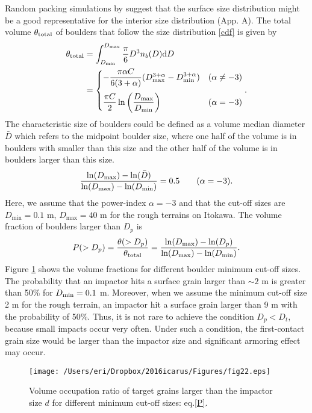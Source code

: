 \documentclass[3p,authoryear]{elsarticle}
\renewcommand{\d}{{\rm{d}}}
\begin{document}
Random packing simulations by \citet{tancredi2015} suggest that the surface size distribution might be a good representative for the interior size distribution (App. A).
The total volume $\theta_{\rm total}$ of boulders that follow the size distribution \eqref{cdf} is given by
\begin{align}
	\theta_\text{total}&=\int_{D_{\rm min}}^{D_{\rm max}} \frac{\pi}{6} D^3 n_b(D) {\rm d} D \notag \\
	&=\begin{cases} -\dfrac{\pi \alpha C}{6(3+\alpha)} (D_{\rm max}^{3+\alpha}-D_{\rm min}^{3+\alpha})& (\alpha\neq -3) \medskip\\
	\dfrac{\pi C}{2}\ln\left(\dfrac{D_{\rm max}}{D_{\rm min}}\right) & (\alpha=-3) \end{cases} .
\end{align}
The characteristic size of boulders could be defined as a volume median diameter $\bar{D}$ which refers to the midpoint boulder size, where one half of the volume is in boulders with smaller than this size and the other half of the volume is in boulders larger than this size.
\begin{equation}
	\frac{\ln (D_{\rm max})-\ln (\bar{D})}{\ln (D_{\rm max})-\ln (D_{\rm min})}=0.5\qquad (\alpha=-3).
\end{equation}
Here, we assume that the power-index $\alpha =-3$ and that the cut-off sizes are $D_\text{min}=0.1$ m, $D_\text{max}=40$ m for the rough terrains on Itokawa.
The volume fraction of boulders larger than $D_p$ is
\begin{equation}
	P(>D_p) = \frac{\theta(>D_p)}{\theta_\text{total}}=\frac{\ln (D_{\rm max})-\ln (D_p)}{\ln (D_{\rm max})-\ln (D_{\rm min})}. \label{P}
\end{equation}
Figure \ref{graph-P} shows the volume fractions for different boulder minimum cut-off sizes.
The probability that an impactor hits a surface grain larger than $\sim2$ m is greater than 50\% for $D_{\rm min}=0.1$ m.
Moreover, when we assume the minimum cut-off size 2 m for the rough terrain, an impactor hit a surface grain larger than 9 m with the probability of 50\%.
Thus, it is not rare to achieve the condition $D_p<D_t$, because small impacts occur very often.
Under such a condition, the first-contact grain size would be larger than the impactor size and significant armoring effect may occur.
\begin{figure}[htbp]
	\begin{center}
	\texttt{[image: /Users/eri/Dropbox/2016icarus/Figures/fig22.eps]}
	\caption{Volume occupation ratio of target grains larger than the impactor size $d$ for different minimum cut-off sizes: eq.\eqref{P}.}
	\label{graph-P}
	\end{center}
\end{figure}
\end{document}

